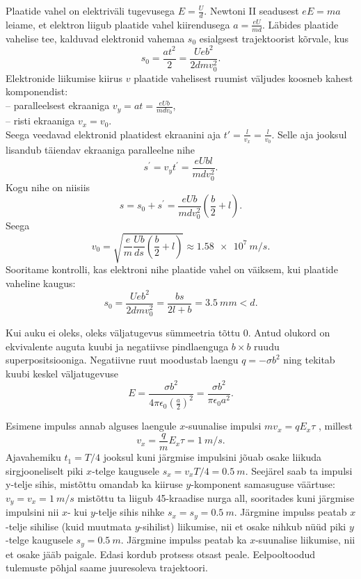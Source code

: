 \documentclass[10pt, twoside]{article}
\begin{document}
{Plaatide vahel on elektriväli tugevusega $E = \frac{U}{d}$. Newtoni II seadusest $eE = ma$ leiame, et elektron liigub plaatide vahel kiirendusega $a = \frac{eU}{md}$. Läbides plaatide vahelise tee, kalduvad elektronid vahemaa $s_0$ esialgsest trajektoorist kõrvale, kus
\[
s_{0}=\frac{a t^{2}}{2}=\frac{U e b^{2}}{2 d m v_{0}^{2}}.
\]
Elektronide liikumise kiirus $v$ plaatide vahelisest ruumist väljudes koosneb kahest komponendist:\\
-- paralleelsest ekraaniga $v_{y}=a t=\frac{e U b}{m d v_{0}}$,\\
-- risti ekraaniga $v_x = v_0$.\\
Seega veedavad elektronid plaatidest ekraanini aja $t' = \frac{l}{v_x} = \frac{l}{v_0}$. Selle aja jooksul lisandub täiendav ekraaniga paralleelne nihe
\[
s^{\prime}=v_{y} t^{\prime}=\frac{e U b l}{m d v_{0}^{2}}.
\]
Kogu nihe on niisiis
\[
s=s_{0}+s^{\prime}=\frac{e U b}{m d v_{0}^{2}}\left(\frac{b}{2}+l\right).
\]
Seega
\[
v_{0}=\sqrt{\frac{e}{m} \frac{U b}{d s}\left(\frac{b}{2}+l\right)} \approx \SI{1,58e7}{m/s}.
\]
Sooritame kontrolli, kas elektroni nihe plaatide vahel on väiksem, kui plaatide vaheline kaugus:
\[
s_{0}=\frac{U e b^{2}}{2 d m v_{0}^{2}}=\frac{bs}{2l + b} = \SI{3.5}{mm} < d.
\]
\probend
\bigskip


\solu
Kui auku ei oleks, oleks väljatugevus sümmeetria tõttu 0. Antud olukord on ekvivalente auguta kuubi ja negatiivse pindlaenguga $b\times b$ ruudu superpositsiooniga. Negatiivne ruut moodustab laengu $q = -\sigma b^2$ ning tekitab kuubi keskel väljatugevuse
\[
E=\frac{\sigma b^{2}}{4\pi \epsilon_{0} \left(\frac{a}{2}\right)^{2}} = \frac{\sigma b^{2}}{\pi \epsilon_{0} a^{2}}.
\]
\probend
\bigskip


\solu
Esimene impulss annab alguses laengule $x$-suunalise impulsi $mv_x = qE_x\tau$ , millest
\[
v_{x}=\frac{q}{m} E_{x} \tau= \SI{1}{m/s}.
\]
Ajavahemiku $t_1 = T /4$ jooksul kuni järgmise impulsini jõuab osake liikuda sirgjooneliselt piki $x$-telge kaugusele
$s_x = v_xT /4 = \SI{0,5}{m}$. Seejärel saab ta impulsi y-telje sihis, mistõttu omandab ka kiiruse $y$-komponent
samasuguse väärtuse: $v_y = v_x = \SI{1}{m/s}$ mistõttu ta liigub \num{45}-kraadise nurga all,
sooritades kuni järgmise impulsini nii $x$- kui $y$-telje sihis nihke $s_x = s_y = \SI{0,5}{m}$. Järgmine impulss peatab $x$-telje sihilise (kuid muutmata $y$-sihilist) liikumise, nii et
osake nihkub nüüd piki $y$-telge kaugusele $s_y = \SI{0,5}{m}$. Järgmine impulss peatab ka $x$-suunalise liikumise, nii et osake jääb paigale. Edasi kordub protsess otsast
peale. Eelpooltoodud tulemuste põhjal saame juuresoleva trajektoori.

}
\end{document}

